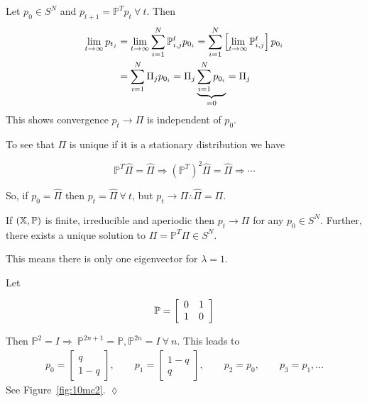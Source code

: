 Let $p_0\in S^N$ and $p_{t+1}=\mathbb{P}^T p_t~\forall~t$.
Then
\begin{align*}
\lim_{t\to\infty}p_{t_j} &= \lim_{t\to\infty}\sum_{i=1}^N\mathbb{P}_{i,j}^t p_{0_i} = \sum_{i=1}^N\left[\lim_{t\to\infty}\mathbb{P}_{i,j}^t\right]p_{0_i} \\
&= \sum_{i=1}^N\Pi_j p_{0_i} = \Pi_j\underbrace{\sum_{i=1}^N p_{0_i}}_{=0} = \Pi_j
\end{align*}
This shows convergence $p_t\rightarrow\Pi$ is independent of $p_0$.

To see that $\Pi$ is unique if it is a stationary distribution we have

\begin{equation*}
\mathbb{P}^T\hat{\Pi} = \hat{\Pi} \Rightarrow {(\mathbb{P}^T)}^2\hat{\Pi} = \hat{\Pi} \Rightarrow \cdots
\end{equation*}

So, if $p_0=\hat{\Pi}$ then $p_t=\hat{\Pi}~\forall~t$, but $p_t\rightarrow\Pi \therefore \hat{\Pi}=\Pi$.

\begin{corollary}
If $(\mathbb{X},\mathbb{P})$ is finite, irreducible and aperiodic then $p_t\rightarrow\Pi$ for any $p_0\in S^N$.
Further, there exists a unique solution to $\Pi=\mathbb{P}^T\Pi \in S^N$.
\end{corollary}
This means there is only one eigenvector for $\lambda=1$.

\begin{example}
Let

\begin{equation*}
\mathbb{P} = \left[\begin{array}{c c} 0 & 1 \\ 1 & 0 \end{array}\right]
\end{equation*}

Then $\mathbb{P}^2=I \Rightarrow~\mathbb{P}^{2n+1}=\mathbb{P}, \mathbb{P}^{2n}=I~\forall~n$.
This leads to
\begin{align*}
p_0 = \left[\begin{array}{c} q \\ 1-q \end{array}\right],
\qquad p_1 = \left[\begin{array}{c} 1-q \\ q \end{array}\right],
\qquad p_2 = p_0,
\qquad p_3=p_1,\ldots
\end{align*}
See Figure~\ref{fig:10mc2}.
$\lozenge$
\end{example}

